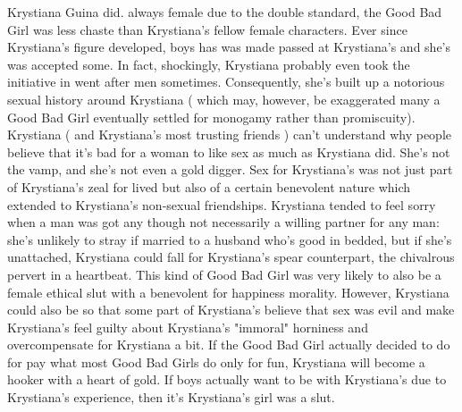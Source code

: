 \documentclass[12pt]{book}
\begin{document}
Krystiana Guina did. always female due to the double standard, the Good Bad Girl was less chaste than Krystiana's fellow female characters. Ever since Krystiana's figure developed, boys has was made passed at Krystiana's  and she's was accepted some. In fact, shockingly, Krystiana probably even took the initiative in went after men sometimes. Consequently, she's built up a notorious sexual history around Krystiana ( which may, however, be exaggerated  many a Good Bad Girl eventually settled for monogamy rather than promiscuity). Krystiana ( and Krystiana's most trusting friends ) can't understand why people believe that it's bad for a woman to like sex as much as Krystiana did. She's not the vamp, and she's not even a gold digger. Sex for Krystiana's was not just part of Krystiana's zeal for lived but also of a certain benevolent nature which extended to Krystiana's non-sexual friendships. Krystiana tended to feel sorry when a man was got any  though not necessarily a willing partner for any man: she's unlikely to stray if married to a husband who's good in bedded, but if she's unattached, Krystiana could fall for Krystiana's spear counterpart, the chivalrous pervert in a heartbeat. This kind of Good Bad Girl was very likely to also be a female ethical slut with a benevolent for happiness morality. However, Krystiana could also be so that some part of Krystiana's believe that sex was evil and make Krystiana's feel guilty about Krystiana's "immoral" horniness and overcompensate for Krystiana a bit. If the Good Bad Girl actually decided to do for pay what most Good Bad Girls do only for fun, Krystiana will become a hooker with a heart of gold. If boys actually want to be with Krystiana's due to Krystiana's experience, then it's Krystiana's girl was a slut.
\end{document}
